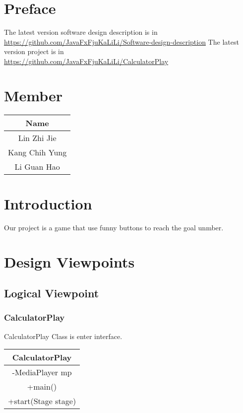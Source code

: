 \section{Preface}
The latest version software design description is in\\ \url{https://github.com/JavaFxFjuKaLiLi/Software-design-description}
The latest version project is in\\ \url{https://github.com/JavaFxFjuKaLiLi/CalculatorPlay}
\tableofcontents

\section{Member}
\begin{center}\begin{tabular}{ |c| } \hline Name \\ \hline Lin Zhi Jie \\ \hline Kang Chih Yung \\ \hline Li Guan Hao \\ \hline \end{tabular}\end{center}

\section{Introduction}
Our project is a game that use funny buttons to reach the goal unmber.
\section{Design Viewpoints}

\subsection{Logical Viewpoint}

\subsubsection{CalculatorPlay}
CalculatorPlay Class is enter interface.
\begin{center}\begin{tabular}{ |c| } \hline CalculatorPlay \\ \hline -MediaPlayer mp \\ \hline +main() \\ +start(Stage stage) \\ \hline \end{tabular}\end{center}

